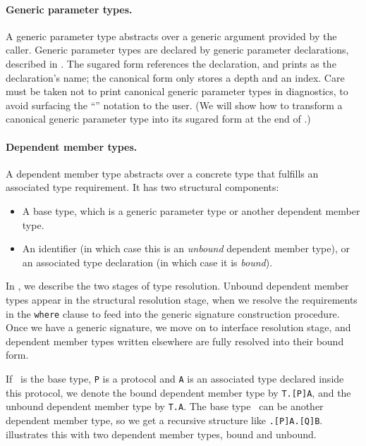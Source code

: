 \documentclass[../generics]{subfiles}
\begin{document}
\paragraph{Generic parameter types.} A generic parameter type abstracts over a generic argument provided by the caller. Generic parameter types are declared by generic parameter declarations, described in . The sugared form references the declaration, and prints as the declaration's name; the canonical form only stores a depth and an index. Care must be taken not to print canonical generic parameter types in diagnostics, to avoid surfacing the ``'' notation to the user. (We will show how to transform a canonical generic parameter type into its sugared form at the end of .)

\paragraph{Dependent member types.}
A dependent member type abstracts over a concrete type that fulfills an associated type requirement. It has two structural components:
\begin{itemize}
\item A base type, which is a generic parameter type or another dependent member type.
\item An identifier (in which case this is an \emph{unbound} dependent member type), or an associated type declaration (in which case it is \emph{bound}).
\end{itemize}

In , we describe the two stages of type resolution. Unbound dependent member types appear in the structural resolution stage, when we resolve the requirements in the \texttt{where} clause to feed into the generic signature construction procedure. Once we have a generic signature, we move on to interface resolution stage, and dependent member types written elsewhere are fully resolved into their bound form.

If \tT\ is the base type, \texttt{P} is a protocol and \texttt{A} is an associated type declared inside this protocol, we denote the bound dependent member type by \texttt{T.[P]A}, and the unbound dependent member type by \texttt{T.A}. The base type \tT\ can be another dependent member type, so we get a recursive structure like \texttt{.[P]A.[Q]B}.  illustrates this with two dependent member types, bound and unbound.
\end{document}
